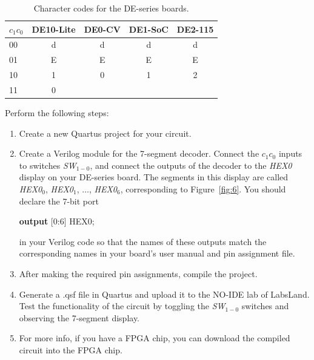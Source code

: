 \documentclass[epsfig,10pt,fullpage]{article}
\begin{document}
\begin{table}[H]
	\begin{center}
	\begin{tabular}{l | c | c | c | c}
	$c_1 c_0$ & DE10-Lite & DE0-CV & DE1-SoC & DE2-115 \\
	\hline
	{\rule[0mm]{0mm}{5mm}\hspace{0.75 mm} 00} & d & d & d & d \\
	\hspace{0.75 mm}
	01 & E & E & E & E \\
	\hspace{0.75 mm}
	10 & 1 & 0 & 1 & 2 \\
	\hspace{0.75 mm}
	11 & 0 & & & \\
	\end{tabular}
	\caption{Character codes for the DE-series boards.}
	\label{tab:codes}
	\end{center}
\end{table}

Perform the following steps:

\begin{enumerate}
\item Create a new Quartus project for your circuit.
\item Create a Verilog module for the 7-segment decoder. Connect the $c_1 c_0$ inputs
to switches {\it SW}$_{1-0}$, and connect the outputs of the decoder to the {\it HEX0} 
display on your DE-series board. The segments in this display are called 
{\it HEX0}$_0$, {\it HEX0}$_1$, $\ldots$, {\it HEX0}$_6$, corresponding to  Figure~\ref{fig:6}.
You should declare the 7-bit port 

\begin{center}
\begin{minipage}[t]{12.5 cm}
\begin{tabbing}
{\bf output} [0:6] HEX0;
\end{tabbing}
\end{minipage}
\end{center}

in your Verilog code so that the
names of these outputs match the corresponding names in your board's user manual and pin assignment file.
\item After making the required pin assignments, compile the project.
\item Generate a .qsf file in Quartus and upload it to the NO-IDE lab of LabsLand. Test the functionality of the 
circuit by toggling the {\it SW}$_{1-0}$ switches and observing the 7-segment display.
\item For more info, if you have a FPGA chip, you can download the compiled circuit into the FPGA chip.
\end{enumerate}
\end{document}
